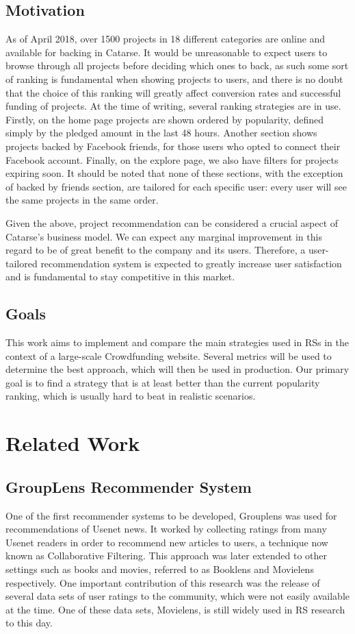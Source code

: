 \documentclass[cic,tc,english]{iiufrgs}
\begin{document}
\section{Motivation}
As of April 2018, over 1500 projects in 18 different categories are online and available for backing in Catarse. It would be unreasonable to expect users to browse through all projects before deciding which ones to back, as such some sort of ranking is fundamental when showing projects to users, and there is no doubt that the choice of this ranking will greatly affect conversion rates and successful funding of projects. At the time of writing, several ranking strategies are in use. Firstly, on the home page projects are shown ordered by popularity, defined simply by the pledged amount in the last 48 hours. Another section shows projects backed by Facebook friends, for those users who opted to connect their Facebook account. Finally, on the explore page, we also have filters for projects expiring soon. It should be noted that none of these sections, with the exception of backed by friends section, are tailored for each specific user: every user will see the same projects in the same order.

Given the above, project recommendation can be considered a crucial aspect of Catarse's business model. We can expect any marginal improvement in this regard to be of great benefit to the company and its users. Therefore, a user-tailored recommendation system is expected to greatly increase user satisfaction and is fundamental to stay competitive in this market.

\section{Goals}
This work aims to implement and compare the main strategies used in RSs in the context of a large-scale Crowdfunding website. Several metrics will be used to determine the best approach, which will then be used in production. Our primary goal is to find a strategy that is at least better than the current popularity ranking, which is usually hard to beat in realistic scenarios.

\chapter{Related Work}
\section{GroupLens Recommender System}
One of the first recommender systems to be developed, Grouplens was used for recommendations of Usenet news. It worked by collecting ratings from many Usenet readers in order to recommend new articles to users, a technique now known as Collaborative Filtering.
This approach was later extended to other settings such as books and movies, referred to as Booklens and Movielens respectively. One important contribution of this research was the release of several data sets of user ratings to the community, which were not easily available at the time. One of these data sets, Movielens, is still widely used in RS research to this day.
\end{document}
